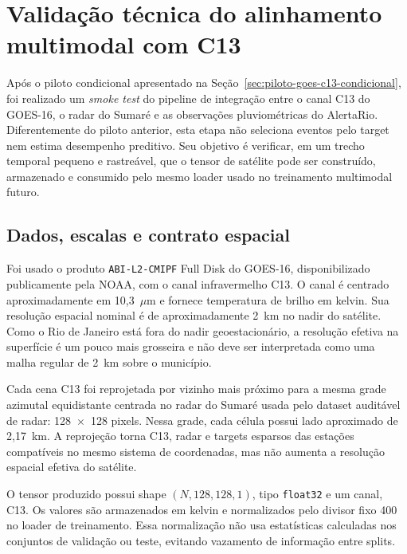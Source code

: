 
\section{Validação técnica do alinhamento multimodal com C13}
\label{sec:smoke-goes16-c13}

Após o piloto condicional apresentado na Seção~\ref{sec:piloto-goes-c13-condicional}, foi realizado um \emph{smoke test} do pipeline de integração entre o canal C13 do GOES-16, o radar do Sumaré e as observações pluviométricas do AlertaRio. Diferentemente do piloto anterior, esta etapa não seleciona eventos pelo target nem estima desempenho preditivo. Seu objetivo é verificar, em um trecho temporal pequeno e rastreável, que o tensor de satélite pode ser construído, armazenado e consumido pelo mesmo loader usado no treinamento multimodal futuro.

\subsection{Dados, escalas e contrato espacial}
\label{subsec:smoke-c13-escalas}

Foi usado o produto \texttt{ABI-L2-CMIPF} Full Disk do GOES-16, disponibilizado publicamente pela NOAA, com o canal infravermelho C13. O canal é centrado aproximadamente em 10,3~$\mu$m e fornece temperatura de brilho em kelvin. Sua resolução espacial nominal é de aproximadamente 2~km no nadir do satélite. Como o Rio de Janeiro está fora do nadir geoestacionário, a resolução efetiva na superfície é um pouco mais grosseira e não deve ser interpretada como uma malha regular de 2~km sobre o município.

Cada cena C13 foi reprojetada por vizinho mais próximo para a mesma grade azimutal equidistante centrada no radar do Sumaré usada pelo dataset auditável de radar: 128~$\times$~128 pixels. Nessa grade, cada célula possui lado aproximado de 2,17~km. A reprojeção torna C13, radar e targets esparsos das estações compatíveis no mesmo sistema de coordenadas, mas não aumenta a resolução espacial efetiva do satélite.

O tensor produzido possui shape $(N, 128, 128, 1)$, tipo \texttt{float32} e um canal, C13. Os valores são armazenados em kelvin e normalizados pelo divisor fixo 400 no loader de treinamento. Essa normalização não usa estatísticas calculadas nos conjuntos de validação ou teste, evitando vazamento de informação entre splits.

